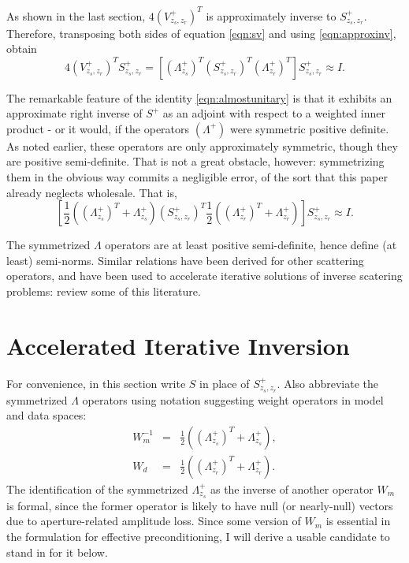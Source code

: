 \documentclass[georeport,12pt]{geophysics}
\begin{document}
As shown in the last section, $4(V_{z_s,z_r}^+)^T$ is approximately
inverse to $S^{+}_{z_s,z_r}$. Therefore, transposing both sides of
equation \ref{eqn:sv} and using \ref{eqn:approxinv}, obtain
\begin{equation}
  \label{eqn:almostunitary}
  4(V_{z_s,z_r}^+)^TS^+_{z_s,z_r} = [ (\Lambda^+_{z_s})^T
  (S^{+}_{z_s,z_r})^T(\Lambda^+_{z_r})^T]S^{+}_{z_s,z_r} \approx I.
\end{equation}

The remarkable feature of the identity \ref{eqn:almostunitary} is that
it exhibits an approximate right inverse of $S^+$ as an adjoint with
respect to a weighted inner product - or it would, if the operators
$(\Lambda^+)$ were symmetric positive definite. As noted earlier,
these operators are only approximately symmetric, though they are
positive semi-definite. That is not a great obstacle, however:
symmetrizing them in the obvious way commits a negligible error, of
the sort that this paper already neglects wholesale. That is,
\begin{equation}
  \label{eqn:unitary}
  [ \frac{1}{2}((\Lambda^+_{z_s})^T+ \Lambda^+_{z_s})
  (S^{+}_{z_s,z_r})^T \frac{1}{2}((\Lambda^+_{z_r})^T+
  \Lambda^+_{z_r})]S^{+}_{z_s,z_r} \approx I.
\end{equation}


The symmetrized $\Lambda$ operators are at least positive
semi-definite, hence define (at least) semi-norms.
Similar relations have been derived for other scattering operators,
and have been used to accelerate iterative solutions of inverse
scatering problems: \cite{DafniSymes:SEG18b} review some of this
literature.

\section{Accelerated Iterative Inversion}

For convenience, in this section write $S$ in place of
$S^+_{z_s,z_r}$. Also abbreviate the symmetrized $\Lambda$ operators
using notation suggesting weight
operators in model and data spaces:
\begin{eqnarray}
  W_m^{-1}&=& \frac{1}{2}((\Lambda^+_{z_s})^T+
              \Lambda^+_{z_s}),\nonumber \\
  W_d &=& \frac{1}{2}((\Lambda^+_{z_r})^T+ \Lambda^+_{z_r}).
          \label{eqn:wdef}
\end{eqnarray}
The identification of the symmetrized $\Lambda^+_{z_s}$ as the inverse
of another operator $W_m$ is formal, since the former operator is
likely to have null (or nearly-null) vectors due to aperture-related
amplitude loss. Since some version of $W_m$ is essential in the
formulation for effective preconditioning, I will derive a usable
candidate to stand in for it below.
\end{document}
